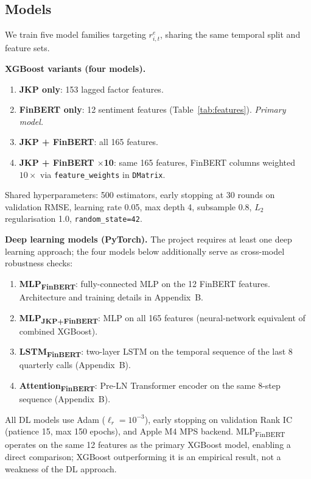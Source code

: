 \subsection{Models}

We train five model families targeting $r^e_{i,t}$, sharing the same temporal split and feature sets.

\textbf{XGBoost variants (four models).}
\begin{enumerate}[noitemsep]
    \item \textbf{JKP only}: 153 lagged factor features.
    \item \textbf{FinBERT only}: 12 sentiment features (Table~\ref{tab:features}). \textit{Primary model.}
    \item \textbf{JKP + FinBERT}: all 165 features.
    \item \textbf{JKP + FinBERT $\times$10}: same 165 features, FinBERT columns weighted $10\times$ via \texttt{feature\_weights} in \texttt{DMatrix}.
\end{enumerate}
Shared hyperparameters: 500 estimators, early stopping at 30 rounds on validation RMSE, learning rate 0.05, max depth 4, subsample 0.8, $L_2$ regularisation 1.0, \texttt{random\_state=42}.

\textbf{Deep learning models (PyTorch).} The project requires at least one deep learning approach; the four models below additionally serve as cross-model robustness checks:
\begin{enumerate}[noitemsep]
    \item \textbf{MLP\textsubscript{FinBERT}}: fully-connected MLP on the 12 FinBERT features. Architecture and training details in Appendix~B.
    \item \textbf{MLP\textsubscript{JKP+FinBERT}}: MLP on all 165 features (neural-network equivalent of combined XGBoost).
    \item \textbf{LSTM\textsubscript{FinBERT}}: two-layer LSTM on the temporal sequence of the last 8 quarterly calls (Appendix~B).
    \item \textbf{Attention\textsubscript{FinBERT}}: Pre-LN Transformer encoder on the same 8-step sequence (Appendix~B).
\end{enumerate}
All DL models use Adam ($\ell_r = 10^{-3}$), early stopping on validation Rank IC (patience 15, max 150 epochs), and Apple M4 MPS backend. MLP\textsubscript{FinBERT} operates on the same 12 features as the primary XGBoost model, enabling a direct comparison; XGBoost outperforming it is an empirical result, not a weakness of the DL approach.

